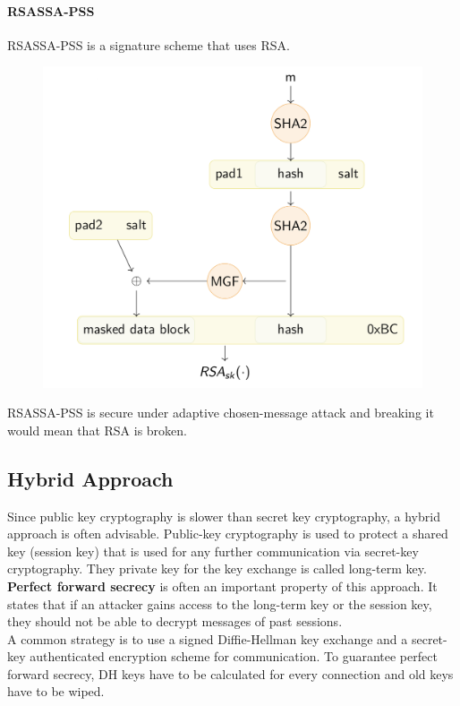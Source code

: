 \paragraph{RSASSA-PSS}
RSASSA-PSS is a signature scheme that uses RSA\@.
\begin{figure}[H]
  \centering
  \includegraphics[width=.8\textwidth]{figures/rsassa-pss.png}
\end{figure}
RSASSA-PSS is secure under adaptive chosen-message attack and breaking it would mean that RSA is broken.

\subsection{Hybrid Approach}
Since public key cryptography is slower than secret key cryptography, a hybrid approach is often advisable.
Public-key cryptography is used to protect a shared key (session key) that is used for any further communication via secret-key cryptography.
They private key for the key exchange is called long-term key.\\

\textbf{Perfect forward secrecy} is often an important property of this approach.
It states that if an attacker gains access to the long-term key or the session key, they should not be able to decrypt messages of past sessions.\\

A common strategy is to use a signed Diffie-Hellman key exchange and a secret-key authenticated encryption scheme for communication.
To guarantee perfect forward secrecy, DH keys have to be calculated for every connection and old keys have to be wiped.
\newpage


